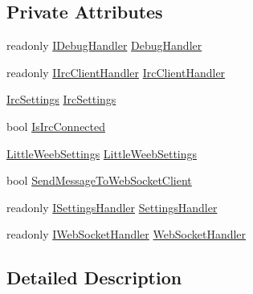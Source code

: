 \subsection*{Private Attributes}
\begin{DoxyCompactItemize}
\item 
readonly \mbox{\hyperlink{interface_little_weeb_library_1_1_handlers_1_1_i_debug_handler}{I\+Debug\+Handler}} \mbox{\hyperlink{class_little_weeb_library_1_1_services_1_1_irc_web_socket_service_a14115a06f9abb3ce67d655602f19ad9f}{Debug\+Handler}}
\item 
readonly \mbox{\hyperlink{interface_little_weeb_library_1_1_handlers_1_1_i_irc_client_handler}{I\+Irc\+Client\+Handler}} \mbox{\hyperlink{class_little_weeb_library_1_1_services_1_1_irc_web_socket_service_ae64fc278865ee8ee000e804033675455}{Irc\+Client\+Handler}}
\item 
\mbox{\hyperlink{class_little_weeb_library_1_1_settings_1_1_irc_settings}{Irc\+Settings}} \mbox{\hyperlink{class_little_weeb_library_1_1_services_1_1_irc_web_socket_service_a6a6a9c8d3bb672d74b564ba68c335970}{Irc\+Settings}}
\item 
bool \mbox{\hyperlink{class_little_weeb_library_1_1_services_1_1_irc_web_socket_service_a6621f29728a33aa4be9edbdba319ac9e}{Is\+Irc\+Connected}}
\item 
\mbox{\hyperlink{class_little_weeb_library_1_1_settings_1_1_little_weeb_settings}{Little\+Weeb\+Settings}} \mbox{\hyperlink{class_little_weeb_library_1_1_services_1_1_irc_web_socket_service_abfb3948233f18e1eb9e268687f862f24}{Little\+Weeb\+Settings}}
\item 
bool \mbox{\hyperlink{class_little_weeb_library_1_1_services_1_1_irc_web_socket_service_abeb1251a64e640930814f582196f0058}{Send\+Message\+To\+Web\+Socket\+Client}}
\item 
readonly \mbox{\hyperlink{interface_little_weeb_library_1_1_handlers_1_1_i_settings_handler}{I\+Settings\+Handler}} \mbox{\hyperlink{class_little_weeb_library_1_1_services_1_1_irc_web_socket_service_a388e08365fb36d27ffed7e41f9dd14ff}{Settings\+Handler}}
\item 
readonly \mbox{\hyperlink{interface_little_weeb_library_1_1_handlers_1_1_i_web_socket_handler}{I\+Web\+Socket\+Handler}} \mbox{\hyperlink{class_little_weeb_library_1_1_services_1_1_irc_web_socket_service_a44141a0f98eabf4a14c1c4da0ddf77f1}{Web\+Socket\+Handler}}
\end{DoxyCompactItemize}


\subsection{Detailed Description}


